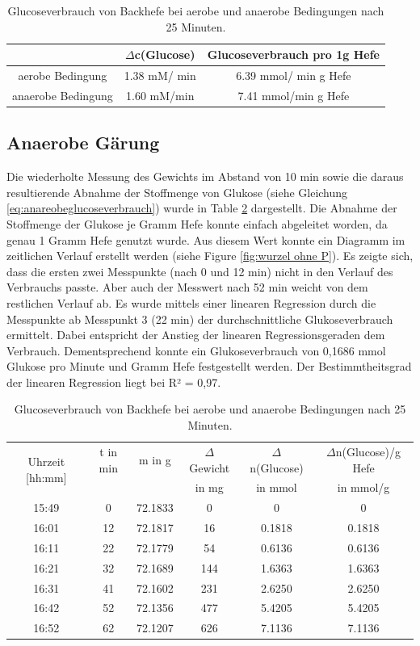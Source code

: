 \documentclass[10pt,a4paper]{article}
\begin{document}
		\begin{table}[H]
			\centering
			\caption{Glucoseverbrauch von Backhefe bei aerobe und anaerobe Bedingungen nach 25 Minuten.}
			\label{tab:Glucoseverbrauch}
			\begin{tabular}{ccc}
				\toprule
				& $\Delta$c(Glucose) & Glucoseverbrauch pro 1g Hefe\\
				\midrule
				aerobe Bedingung & 1.38 mM/ min & 6.39 mmol/ min g Hefe\\
				anaerobe Bedingung & 1.60 mM/min & 7.41 mmol/min g Hefe\\
				\bottomrule
			\end{tabular}
		\end{table}	
		
	\subsection{Anaerobe Gärung}
	Die wiederholte Messung des Gewichts im Abstand von 10 min sowie die daraus resultierende Abnahme der Stoffmenge von Glukose (siehe Gleichung \ref{eq:anareobeglucoseverbrauch}) wurde in Table \ref{tab:anaerobe glucoseverbrauch} dargestellt. Die Abnahme der Stoffmenge der Glukose je Gramm Hefe konnte einfach abgeleitet worden, da genau 1 Gramm Hefe genutzt wurde. Aus diesem Wert konnte ein Diagramm im zeitlichen Verlauf erstellt werden (siehe Figure \ref{fig:wurzel ohne P}). Es zeigte sich, dass die ersten zwei Messpunkte (nach 0 und 12 min) nicht in den Verlauf des Verbrauchs passte. Aber auch der Messwert nach 52 min weicht von dem restlichen Verlauf ab. Es wurde mittels einer linearen Regression durch die Messpunkte ab Messpunkt 3 (22 min) der durchschnittliche Glukoseverbrauch ermittelt. Dabei entspricht der Anstieg der linearen Regressionsgeraden dem Verbrauch. Dementsprechend konnte ein Glukoseverbrauch von 0,1686 mmol Glukose pro Minute und Gramm Hefe festgestellt werden. Der Bestimmtheitsgrad der linearen Regression liegt bei R² = 0,97.
	
	\begin{table}[H]
		\centering
		\caption{Glucoseverbrauch von Backhefe bei aerobe und anaerobe Bedingungen nach 25 Minuten.}
		\label{tab:anaerobe glucoseverbrauch}
		\begin{tabular}{cccccc}
			\toprule
			\multirow{2}{*}{Uhrzeit [hh:mm]}& t in min & m in g & $\Delta$ Gewicht & $\Delta$ n(Glucose) & $\Delta$n(Glucose)/g Hefe\\
			& && in mg & in mmol&  in mmol/g\\
			\midrule
			15:49 & 0 & 72.1833 & 0 & 0 & 0\\
			16:01 & 12 & 72.1817 & 16 & 0.1818 & 0.1818\\
			16:11 & 22 & 72.1779 & 54 & 0.6136 & 0.6136\\
			16:21 & 32 & 72.1689 & 144 & 1.6363 & 1.6363\\
			16:31 & 41 & 72.1602 & 231 & 2.6250 & 2.6250\\
			16:42 & 52 &72.1356 & 477 & 5.4205 & 5.4205\\
			16:52 & 62 & 72.1207 & 626 & 7.1136 & 7.1136\\
			\bottomrule
		\end{tabular}
	\end{table}	
	
\end{document}
